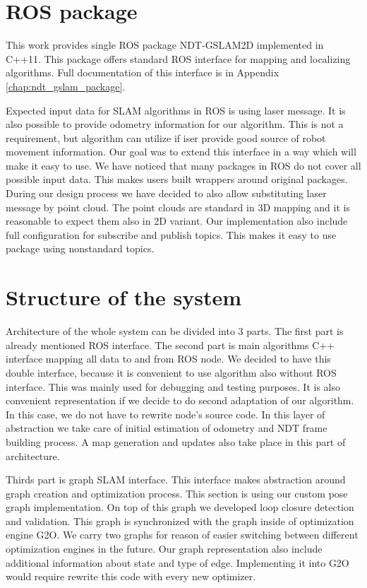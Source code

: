 \section{ROS package}
This work provides single \gls{ROS} package NDT-GSLAM2D implemented in C++11. This package offers standard \gls{ROS} interface for mapping and localizing algorithms. Full documentation of this interface is in Appendix \ref{chap:ndt_gslam_package}. 

Expected input data for \gls{SLAM} algorithms in \gls{ROS} is using laser message. It is also possible to provide odometry information for our algorithm. This is not a requirement, but algorithm can utilize if iser provide good source of robot movement information. Our goal was to extend this interface in a way which will make it easy to use. We have noticed that many packages in \gls{ROS} do not cover all possible input data. This makes users built wrappers around original packages. During our design process we have decided to also allow substituting laser message by point cloud. The point clouds are standard in 3D mapping and it is reasonable to expect them also in 2D variant. Our implementation also include full configuration for subscribe and publish topics. This makes it easy to use package using nonstandard topics.  
\section{Structure of the system}
Architecture of the whole system can be divided into 3 parts. The first part is already mentioned \gls{ROS} interface. The second part is main algorithms C++ interface mapping all data to and from \gls{ROS} node. We decided to have this double interface, because it is convenient to use algorithm also without \gls{ROS} interface. This was mainly used for debugging and testing purposes. It is also convenient representation if we decide to do second adaptation of our algorithm. In this case, we do not have to rewrite node's source code. In this layer of abstraction we take care of initial estimation of odometry and \gls{NDT} frame building process. A map generation and updates also take place in this part of architecture.

Thirds part is graph \gls{SLAM} interface. This interface makes abstraction around graph creation and optimization process. This section is using our custom pose graph implementation. On top of this graph we developed loop closure detection and validation. This graph is synchronized with the graph inside of optimization engine G2O. We carry two graphs for reason of easier switching between different optimization engines in the future. Our graph representation also include additional information about state and type of edge. Implementing it into G2O would require rewrite this code with every new optimizer.

